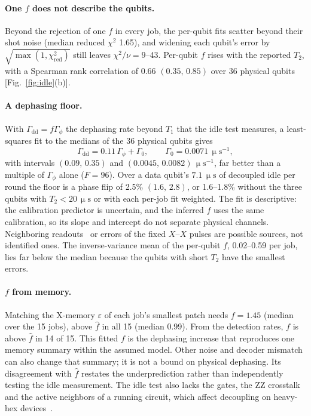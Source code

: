 \documentclass[aps,pra,reprint,nofootinbib,longbibliography,floatfix,showkeys]{revtex4-2}
\newcommand{\eps}{\varepsilon}
\newcommand{\us}{\,\upmu\mathrm{s}}
\newcommand{\fhat}{\hat f}
\newcommand{\ci}[2]{\ensuremath{(#1,\,#2)}}
\begin{document}
\paragraph*{One $f$ does not describe the qubits.}
Beyond the rejection of one $f$ in every job, the per-qubit fits scatter beyond their shot noise (median reduced $\chi^2$ 1.65), and widening each qubit's error by $\sqrt{\max(1, \chi^2_\mathrm{red})}$ still leaves $\chi^2/\nu = 9$--43.
Per-qubit $f$ rises with the reported $T_2$, with a Spearman rank correlation of 0.66 \ci{0.35}{0.85} over 36 physical qubits [Fig.~\ref{fig:idle}(b)].

\paragraph*{A dephasing floor.}
With $\Gamma_\mathrm{dd} = f\Gamma_\phi$ the dephasing rate beyond $T_1$ that the idle test measures, a least-squares fit to the medians of the 36 physical qubits gives
\begin{equation}
\Gamma_\mathrm{dd} = 0.11\,\Gamma_\phi + \Gamma_0 ,\qquad \Gamma_0 = 0.0071\us^{-1} ,
\label{eq:floor}
\end{equation}
with intervals \ci{0.09}{0.35} and \ci{0.0045}{0.0082}$\us^{-1}$, far better than a multiple of $\Gamma_\phi$ alone ($F = 96$).
Over a data qubit's $7.1\us$ of decoupled idle per round the floor is a phase flip of 2.5\% \ci{1.6}{2.8}, or 1.6--1.8\% without the three qubits with $T_2 < 20\us$ or with each per-job fit weighted.
The fit is descriptive: the calibration predictor is uncertain, and the inferred $f$ uses the same calibration, so its slope and intercept do not separate physical channels.
Neighboring readouts~\cite{govia2023randomized,hothem2025measuring} or errors of the fixed $X$--$X$ pulses are possible sources, not identified ones.
The inverse-variance mean of the per-qubit $f$, 0.02--0.59 per job, lies far below the median because the qubits with short $T_2$ have the smallest errors.

\paragraph*{$f$ from memory.}
Matching the X-memory $\eps$ of each job's smallest patch needs $f = 1.45$ (median over the 15 jobs), above $\fhat$ in all 15 (median 0.99).
From the detection rates, $f$ is above $\fhat$ in 14 of 15.
This fitted $f$ is the dephasing increase that reproduces one memory summary within the assumed model.
Other noise and decoder mismatch can also change that summary; it is not a bound on physical dephasing.
Its disagreement with $\fhat$ restates the underprediction rather than independently testing the idle measurement.
The idle test also lacks the gates, the ZZ crosstalk and the active neighbors of a running circuit, which affect decoupling on heavy-hex devices~\cite{vezvaee2026surface}.
\end{document}

